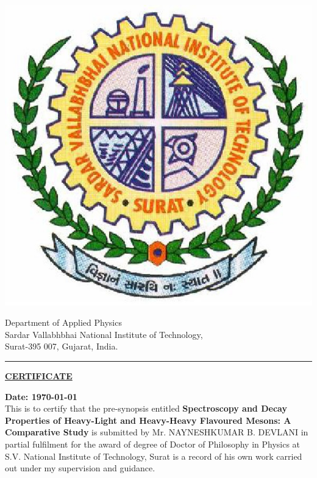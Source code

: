 \documentclass[draft,11pt]{scrreprt}
\begin{document}
\newpage
\begin{minipage}{0.3\textwidth}
\begin{center}
\includegraphics[scale=0.25]{svnit}
\end{center}

\end{minipage}
\hfill
\begin{minipage}{0.65\textwidth}
\large Department of Applied Physics\\
Sardar Vallabhbhai National Institute of Technology,\\
Surat-395 007, Gujarat, India.

\end{minipage}
\vspace*{10pt}

\rule{\columnwidth}{1.5pt}
\vspace*{10pt}
\begin{center}
\large\textbf{\underline{CERTIFICATE}}
\end{center} 
\vspace*{10pt}
\hfill \textbf{Date: \today}\\[15pt]


 This is to certify that the pre-synopsis entitled \textbf{Spectroscopy and Decay Properties of Heavy-Light and Heavy-Heavy Flavoured Mesons: A Comparative Study}  is submitted by Mr.
NAYNESHKUMAR B. DEVLANI in partial fulfilment for the award of degree of Doctor of Philosophy in Physics at S.V. National Institute of Technology, Surat is a record of his own work carried out under my supervision and guidance.
\end{document}
